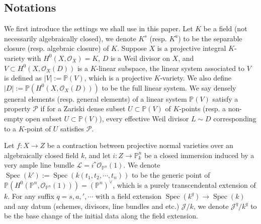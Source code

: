 \documentclass[letterpaper,reqno,12pt]{amsart}
\DeclareMathOperator{\Spec}{Spec}
\numberwithin{equation}{section}
\theoremstyle{plain}
\begin{document}
\subsection*{Notations}%
    We first introduce the settings we shall use in this paper. Let $K$ be a field (not necessarily algebraically closed), we denote $K^s$ (resp. $K^a$) to be the separable closure (resp. algebraic closure) of $K$. Suppose $X$ is a projective integral $K$-variety with $H^0(X,\mathcal O_X)=K$, $D$ is a Weil divisor on $X$, and $V\subset H^0(X,\mathcal O_X(D))$ is a $K$-linear subspace, the linear system associated to $V$ is defined as $|V|:=\mathbb P(V)$, which is a projective $K$-variety. We also define $|D|:=\mathbb P(H^0(X,\mathcal O_X(D)))$ to be the full linear system. We say  densely general elements (resp. general elements) of a linear system $\mathbb P(V)$ satisfy a property $\mathscr P$ if for a Zariski dense subset $U\subset \mathbb P(V)$ of $K$-points (resp. a non-empty open subset $U\subset \mathbb P(V)$), every effective Weil divisor $L\sim D$ corresponding to a $K$-point of $U$ satisfies $\mathscr P$.

    Let $f:X\to Z$ be a contraction between projective normal varieties over an algebraically closed field $k$, and let $i:Z\to \mathbb P_k^n$ be a closed immersion induced by a very ample line bundle $\mathscr L=i^*\mathcal O_{\mathbb P^n}(1)$. We denote $\Spec(k'):=\Spec(k(t_1,t_2,\cdots,t_n))$ to be the generic point of $\mathbb P(H^0(\mathbb P^n,\mathcal O_{\mathbb P^n}(1)))=(\mathbb P^{n})^\vee$, which is a purely transcendental extension of $k$. For any suffix $q=s,a,\prime,\cdots$ with a field extension $\Spec(k^q)\to\Spec(k)$ and any datum (schemes, divisors, line bundles and etc.) $\mathcal J/k$, we denote $\mathcal J^q/k^q$ to be the base change of the initial data along the field extension. 
\end{document}
